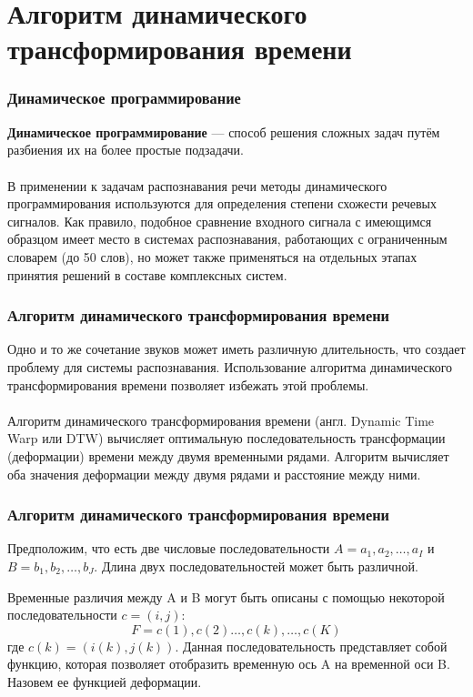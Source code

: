 \documentclass[slidestop, compress, mathserif, blackandwhite, utf8, serif, slidescentered]{beamer}
\begin{document}
\section{Алгоритм динамического трансформирования времени}
\begin{frame}[plain]
	\frametitle{Динамическое программирование}
	\textbf{Динамическое программирование} — способ решения сложных задач путём разбиения их на более простые подзадачи.\\~\\

	В применении к задачам распознавания речи методы динамического программирования используются для определения степени схожести речевых сигналов. Как правило, подобное сравнение входного сигнала с имеющимся образцом имеет место в системах распознавания, работающих с ограниченным словарем (до 50 слов), но может также применяться на отдельных этапах принятия решений в составе комплексных систем.

\end{frame}

\begin{frame}[plain]
	\frametitle{Алгоритм динамического трансформирования времени}
	Одно и то же сочетание звуков может иметь различную длительность, что создает проблему для системы распознавания. Использование алгоритма динамического трансформирования времени позволяет избежать этой проблемы.\\~\\

	Алгоритм динамического трансформирования времени (англ. Dynamic Time Warp или DTW) вычисляет оптимальную последовательность трансформации (деформации) времени между двумя временными рядами. Алгоритм вычисляет оба значения деформации между двумя рядами и расстояние между ними.
\end{frame}

\begin{frame}[plain]
	\frametitle{Алгоритм динамического трансформирования времени}
	Предположим, что есть две числовые последовательности $A= a_{1}, a_{2}, \dots, a_{I}$ и $B=b_{1}, b_{2}, \dots, b_{J}$. Длина двух последовательностей может быть различной.

	Временные различия между A и B могут быть описаны с помощью некоторой последовательности $c=(i,j)$:
	\begin{equation}
		F=c(1),c(2)\dots,c(k),\dots,c(K)
		\label{eq:F}
	\end{equation}
	где $c(k)=(i(k),j(k))$.
	Данная последовательность представляет собой функцию, которая позволяет отобразить временную ось A на временной оси B. Назовем ее функцией деформации.
\end{frame}
\end{document}
